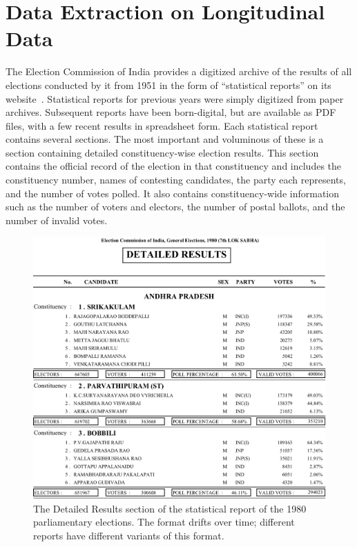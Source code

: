 
\section{Data Extraction on Longitudinal Data}
The Election Commission of India provides a digitized archive of the results of all elections conducted by it from 1951 in the form of ``statistical reports'' on its website~\cite{StatReportECI}.  Statistical reports for previous years were simply digitized from paper archives. Subsequent reports have been born-digital, but are available as PDF files, with a few recent results in spreadsheet form. Each statistical report contains several sections. The most important and voluminous of these is a section containing detailed constituency-wise election results. This section contains the official record of the election in that constituency and includes the constituency number, names of contesting candidates, the party each represents, and the number of votes polled. It also contains constituency-wide information such as the number of voters and electors, the number of postal ballots, and the number of invalid votes. 

\begin{figure}[h!]
  \centering
  \includegraphics[width=\linewidth]{LS7_DR.png}
  \caption{The Detailed Results section of the statistical report of the 1980 parliamentary elections. The format drifts over time; different reports have different variants of this format.}
  \label{DetailedResults}
\end{figure}


